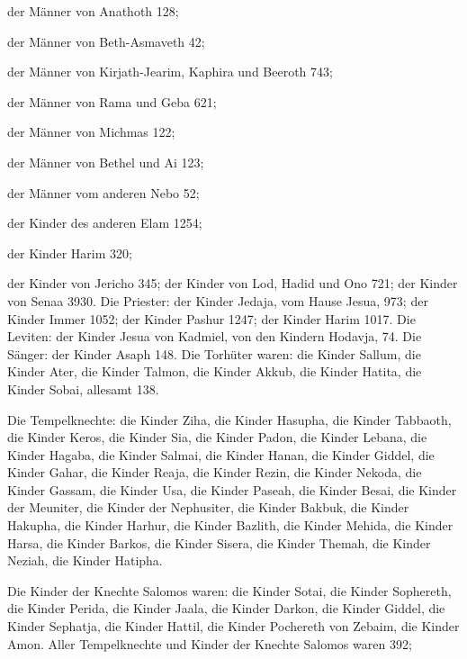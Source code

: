  der Männer von Anathoth 128;

 der Männer von Beth-Asmaveth 42;

 der Männer von Kirjath-Jearim, Kaphira und Beeroth 743;

 der Männer von Rama und Geba 621;

 der Männer von Michmas 122;

 der Männer von Bethel und Ai 123;

 der Männer vom anderen Nebo 52;

 der Kinder des anderen Elam 1254;

 der Kinder Harim 320;

 der Kinder von Jericho 345;  der Kinder
von Lod, Hadid und Ono 721;  der Kinder von Senaa 3930.
 Die Priester: der Kinder Jedaja, vom Hause Jesua, 973;
 der Kinder Immer 1052;  der Kinder Pashur
1247;  der Kinder Harim 1017.  Die
Leviten: der Kinder Jesua von Kadmiel, von den Kindern Hodavja, 74.
 Die Sänger: der Kinder Asaph 148.  Die
Torhüter waren: die Kinder Sallum, die Kinder Ater, die Kinder Talmon,
die Kinder Akkub, die Kinder Hatita, die Kinder Sobai, allesamt 138.

 Die Tempelknechte: die Kinder Ziha, die Kinder Hasupha,
die Kinder Tabbaoth,  die Kinder Keros, die Kinder Sia,
die Kinder Padon,  die Kinder Lebana, die Kinder Hagaba,
die Kinder Salmai,  die Kinder Hanan, die Kinder Giddel,
die Kinder Gahar,  die Kinder Reaja, die Kinder Rezin,
die Kinder Nekoda,  die Kinder Gassam, die Kinder Usa,
die Kinder Paseah,  die Kinder Besai, die Kinder der
Meuniter, die Kinder der Nephusiter,  die Kinder Bakbuk,
die Kinder Hakupha, die Kinder Harhur,  die Kinder
Bazlith, die Kinder Mehida, die Kinder Harsa,  die Kinder
Barkos, die Kinder Sisera, die Kinder Themah,  die Kinder
Neziah, die Kinder Hatipha.

 Die Kinder der Knechte Salomos waren: die Kinder Sotai,
die Kinder Sophereth, die Kinder Perida,  die Kinder
Jaala, die Kinder Darkon, die Kinder Giddel,  die Kinder
Sephatja, die Kinder Hattil, die Kinder Pochereth von Zebaim, die Kinder
Amon.  Aller Tempelknechte und Kinder der Knechte Salomos
waren 392;

